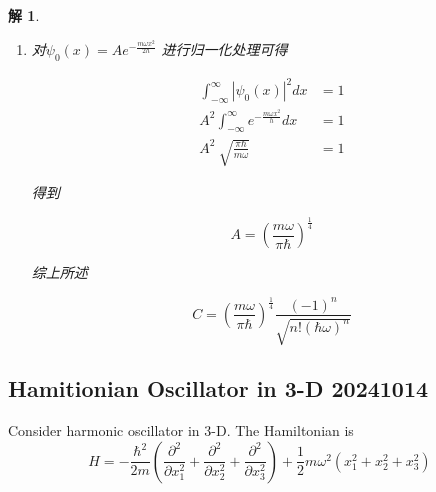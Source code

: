 \documentclass{article}
\newtheorem{solution}{解}
\begin{document}
\begin{solution}
\begin{enumerate}
$$H=a_-a_+-\frac{1}{2}\hbar w$$

$$H|\psi_n\rangle=E|\psi_n\rangle $$

$$(a_-a_+-\frac{1}{2}\hbar\omega)|\psi_n\rangle=(n+\frac{1}{2})\hbar\omega|\psi_n\rangle $$

$$a_-a_+|\psi_n\rangle=(n+1)\hbar w|\psi_n\rangle $$

同理可得

$$a_+a_-|\psi_n\rangle=n\hbar w|\psi_n\rangle $$

由于

$$\langle\psi_n|a_-a_+|\psi_n\rangle=(n+1)\hbar\omega\langle\psi_n|\psi_n\rangle $$
\item[(b)]
对$\psi_{0}(x)=Ae^{-\frac{m\omega x^{2}}{2h}}$ 进行归一化处理可得

$$\begin{aligned}
\int_{-\infty}^{\infty}|\psi_{0}(x)|^{2}dx& =1 \\
A^{2}\int_{-\infty}^{\infty}e^{-{\frac{m\omega x^{2}}{h}}}dx& =1 \\
A^{2}\:\sqrt{\frac{\pi\hbar}{m\omega}}& =1 
\end{aligned}$$

得到

$$A=\left(\frac{m\omega}{\pi\hbar}\right)^{\frac{1}{4}}$$

综上所述

$$C=\left(\frac{m\omega}{\pi\hbar}\right)^{\frac{1}{4}}\frac{(-1)^n}{\sqrt{n!(\hbar\omega)^n}}$$
        
    \end{enumerate}
\end{solution}

























\subsection{Hamitionian Oscillator in 3-D 20241014}
Consider harmonic oscillator in 3-D. The Hamiltonian is
\begin{equation*}
    H=-\frac{\hbar^2}{2m}\left(\frac{\partial^2}{\partial x_1^2}+\frac{\partial^2}{\partial x_2^2}+\frac{\partial^2}{\partial x_3^2}\right)+\frac{1}{2}m\omega^2\left(x_1^2+x_2^2+x_3^2\right)
\end{equation*}
\end{document}
